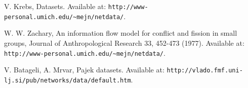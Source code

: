 \documentclass{llncs}
\begin{document}
\begin{thebibliography}{}
V. Krebs, Datasets. Available at: \texttt{http://www-personal.umich.edu/\~{}mejn/netdata/}.

W. W. Zachary, An information flow model for conflict and fission in small groups, Journal of Anthropological Research 33, 452-473 (1977). Available at: \texttt{http://www-personal.umich.edu/\~{}mejn/netdata/}.

V. Batageli, A. Mrvar, Pajek datasets. Available at: \texttt{http://vlado.fmf.uni-lj.si/pub/networks/data/default.htm}.

\end{thebibliography}
\end{document}
